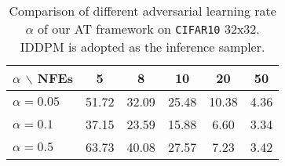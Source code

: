 
\begin{table*}[t!]
\centering
\caption{Comparison of different adversarial learning rate $\alpha$ of our AT framework on \texttt{CIFAR10} 32x32. IDDPM is adopted as the inference sampler.}
\begin{tabular}{lccccc}
\toprule
   $\alpha$ $\backslash$ NFEs & 5 & 8 & 10 & 20 & 50 \\ 
    \midrule
    $\alpha=0.05$ & 51.72 & 32.09 & 25.48 & 10.38 & 4.36 \\
    $\alpha=0.1$ & 37.15 & 23.59  & 15.88 & 6.60 & 3.34 \\
    $\alpha=0.5$ & 63.73 & 40.08 & 27.57 & 7.23 & 3.42 \\
    \bottomrule
    \end{tabular}
\label{tab:alr_ablation_c10}
\end{table*}
